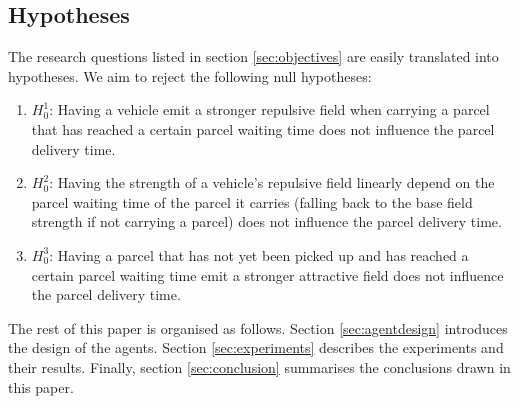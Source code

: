 \subsection{Hypotheses}\label{sec:hypotheses}
The research questions listed in section \ref{sec:objectives} are easily translated into hypotheses. We aim to reject the following null hypotheses:
\begin{enumerate}
\item $H^1_0$: Having a vehicle emit a stronger repulsive field when carrying a parcel that has reached a certain parcel waiting time does not influence the parcel delivery time.
\item $H^2_0$: Having the strength of a vehicle's repulsive field linearly depend on the parcel waiting time of the parcel it carries (falling back to the base field strength if not carrying a parcel) does not influence the parcel delivery time.
\item $H^3_0$: Having a parcel that has not yet been picked up and has reached a certain parcel waiting time emit a stronger attractive field does not influence the parcel delivery time.
\end{enumerate}

The rest of this paper is organised as follows. Section \ref{sec:agentdesign} introduces the design of the agents. Section \ref{sec:experiments} describes the experiments and their results. Finally, section \ref{sec:conclusion} summarises the conclusions drawn in this paper.